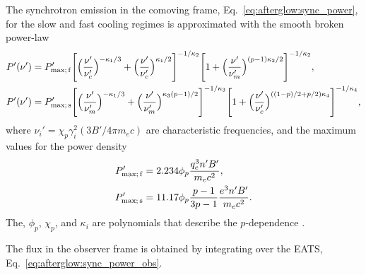 %
The synchrotron emission in the comoving frame, 
Eq.~\eqref{eq:afterglow:sync_power}, for the slow and fast cooling 
regimes is approximated with the smooth broken power-law 
\citep{Johannesson:2006zs}
%
\begin{equation}
\begin{aligned}
P'(\nu') &= P_{\rm max;\, f}' \Bigg[\Big(\frac{\nu'}{\nu_c'}\Big)^{-\kappa_1/3} + \Big(\frac{\nu'}{\nu_c '}\Big)^{\kappa_1/2}\Bigg]^{-1/\kappa_2} \Bigg[1 + \Big(\frac{\nu'}{\nu_m '}\Big)^{(p-1)\kappa_2/2}\Bigg]^{-1/\kappa_2}, \\
P'(\nu') &= P_{\rm max;\, s}' \Bigg[\Big(\frac{\nu'}{\nu_m'}\Big)^{-\kappa_1/3} + \Big(\frac{\nu'}{\nu_m '}\Big)^{\kappa_3(p-1)/2}\Bigg]^{-1/\kappa_3} \Bigg[1 + \Big(\frac{\nu'}{\nu_c '}\Big)^{((1-p)/2 + p/2)\kappa_4}\Bigg]^{-1/\kappa_4},
\end{aligned}
\end{equation}
%
where $\nu_i ' = \chi_p \gamma_i^2 (3 B' / 4 \pi m_e c)$ 
are characteristic frequencies, and the 
maximum values for the power density
%
\begin{align}
P' _{\rm max;\, f} &= 2.234 \phi_p \frac{q_e^3 n' B'}{m_e c^2}, \\
P' _{\rm max;\, s} &= 11.17 \phi_p \frac{p-1}{3p-1}\frac{e^3 n' B'}{m_e c^2}.
\end{align}
%
The, $\phi_p$, $\chi_p$, and $\kappa_i$ are polynomials that 
describe the $p$-dependence \citep{Johannesson:2006zs}.

%
%

The flux in the observer frame is obtained by integrating over the \ac{EATS}, 
Eq.~\eqref{eq:afterglow:sync_power_obs}.





